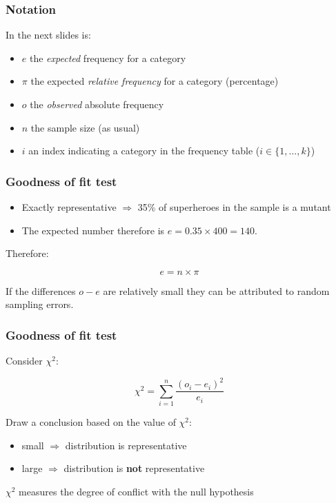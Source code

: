 \documentclass[aspectratio=169]{beamer}
\begin{document}
\begin{frame}
  \frametitle{Notation}
  
  In the next slides is:
  
  \begin{itemize}
    \item $e$ the \textit{expected} frequency for a category
    \item $\pi$ the expected \textit{relative frequency} for a category (percentage)
    \item $o$ the \textit{observed} absolute frequency
    \item $n$ the sample size (as usual)
    \item $i$ an index indicating a category in the frequency table ($i \in \{1, \ldots, k\}$)
  \end{itemize}
\end{frame}

\begin{frame}
  \frametitle{Goodness of fit test}
  \begin{itemize}
    \item Exactly representative $\Rightarrow$ 35\% of superheroes in the sample is a mutant
    \item The expected number therefore is $e = 0.35 \times 400 = 140$.
  \end{itemize}
  Therefore:
  
  \[ e = n \times \pi \]
  
  If the differences $o - e$ are relatively small they can be attributed to random sampling errors. 
\end{frame}

\begin{frame}
  \frametitle{Goodness of fit test}
  Consider $\chi^{2}$:
  
  \[ \chi^{2} = \sum_{i=1}^{n} \frac{(o_{i} - e_{i})^{2}}{e_{i}} \]
  
  Draw a conclusion based on the value of $\chi^2$:
  \begin{itemize}
    \item small $\Rightarrow$ distribution is representative
    \item large $\Rightarrow$ distribution is \textbf{not} representative
  \end{itemize}
  
  $\chi^{2}$ measures the degree of conflict with the null hypothesis
\end{frame}
\end{document}
